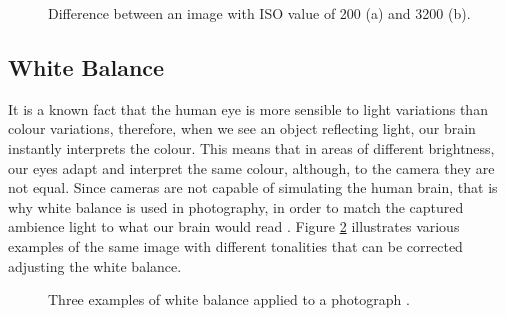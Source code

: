 \begin{figure}[htbp]
        \centering
  \caption{Difference between an image with ISO value of 200 (a) and 3200 (b).}
  \label{fig:iso_example}
\end{figure}

\subsection{White Balance}
\label{sub:white_balance}

It is a known fact that the human eye is more sensible to light variations than colour variations, therefore, when we see an object reflecting light, our brain instantly interprets the colour. This means that in areas of different brightness, our eyes adapt and interpret the same colour, although, to the camera they are not equal.
Since cameras are not capable of simulating the human brain, that is why white balance is used in photography, in order to match the captured ambience light to what our brain would read \cite{kamps2012rules}. Figure \ref{fig:white_balance_example} illustrates various examples of the same image with different tonalities that can be corrected adjusting the white balance.

\begin{figure}[htbp]
        \centering
  \caption{Three examples of white balance applied to a photograph \cite{kamps2012rules}.}
  \label{fig:white_balance_example}
\end{figure}






